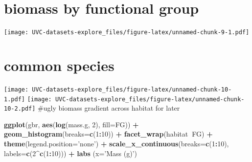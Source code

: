 \documentclass[]{article}
\newenvironment{Shaded}{\begin{snugshade}}{\end{snugshade}}
\newcommand{\KeywordTok}[1]{\textcolor[rgb]{0.13,0.29,0.53}{\textbf{#1}}}
\newcommand{\DataTypeTok}[1]{\textcolor[rgb]{0.13,0.29,0.53}{#1}}
\newcommand{\DecValTok}[1]{\textcolor[rgb]{0.00,0.00,0.81}{#1}}
\newcommand{\StringTok}[1]{\textcolor[rgb]{0.31,0.60,0.02}{#1}}
\newcommand{\OperatorTok}[1]{\textcolor[rgb]{0.81,0.36,0.00}{\textbf{#1}}}
\newcommand{\NormalTok}[1]{#1}
\begin{document}
\begin{Shaded}
\end{Shaded}

\section{biomass by functional group}\label{biomass-by-functional-group}

\texttt{[image: UVC-datasets-explore\_files/figure-latex/unnamed-chunk-9-1.pdf]}

\section{common species}\label{common-species}

\texttt{[image: UVC-datasets-explore\_files/figure-latex/unnamed-chunk-10-1.pdf]}
\texttt{[image: UVC-datasets-explore\_files/figure-latex/unnamed-chunk-10-2.pdf]}
\#ugly biomass gradient across habitat for later

\begin{Shaded}
\begin{Highlighting}[]
\KeywordTok{ggplot}\NormalTok{(gbr, }\KeywordTok{aes}\NormalTok{(}\KeywordTok{log}\NormalTok{(mass.g, }\DecValTok{2}\NormalTok{), }\DataTypeTok{fill=}\NormalTok{FG)) }\OperatorTok{+}\StringTok{ }\KeywordTok{geom_histogram}\NormalTok{(}\DataTypeTok{breaks=}\KeywordTok{c}\NormalTok{(}\DecValTok{1}\OperatorTok{:}\DecValTok{10}\NormalTok{)) }\OperatorTok{+}\StringTok{ }
\StringTok{  }\KeywordTok{facet_wrap}\NormalTok{(habitat}\OperatorTok{~}\NormalTok{FG) }\OperatorTok{+}\StringTok{ }\KeywordTok{theme}\NormalTok{(}\DataTypeTok{legend.position=}\StringTok{'none'}\NormalTok{) }\OperatorTok{+}\StringTok{ }
\StringTok{  }\KeywordTok{scale_x_continuous}\NormalTok{(}\DataTypeTok{breaks=}\KeywordTok{c}\NormalTok{(}\DecValTok{1}\OperatorTok{:}\DecValTok{10}\NormalTok{), }\DataTypeTok{labels=}\KeywordTok{c}\NormalTok{(}\DecValTok{2}\OperatorTok{^}\KeywordTok{c}\NormalTok{(}\DecValTok{1}\OperatorTok{:}\DecValTok{10}\NormalTok{))) }\OperatorTok{+}\StringTok{ }\KeywordTok{labs}\NormalTok{ (}\DataTypeTok{x=}\StringTok{'Mass (g)'}\NormalTok{)}
\end{Highlighting}
\end{Shaded}
\end{document}
